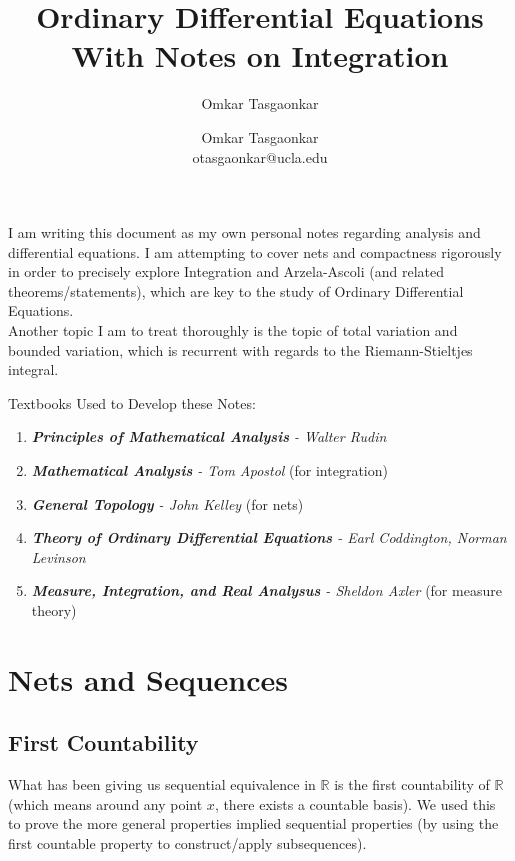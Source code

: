 \documentclass[10pt,letterpaper]{article} %
\author{Omkar Tasgaonkar}
\title{Ordinary Differential Equations \\[0.5em] \large With Notes on Integration}
\author{Omkar Tasgaonkar \\ \small otasgaonkar@ucla.edu}
\date{}
\begin{document}
\maketitle
I am writing this document as my own personal notes regarding analysis and differential equations. I am attempting to cover nets and compactness rigorously in order to precisely explore Integration and Arzela-Ascoli (and related theorems/statements), which are key to the study of Ordinary Differential Equations.\\

Another topic I am to treat thoroughly is the topic of total variation and bounded variation, which is recurrent with regards to the Riemann-Stieltjes integral.\\

\begin{tcolorbox}[colback=white, colframe=black, arc=0mm]
Textbooks Used to Develop these Notes:
\begin{enumerate}
\item \textit{\textbf{Principles of Mathematical Analysis} - Walter Rudin}
\item \textit{\textbf{Mathematical Analysis} - Tom Apostol} (for integration)
\item \textit{\textbf{General Topology} - John Kelley} (for nets)
\item \textit{\textbf{Theory of Ordinary Differential Equations} - Earl Coddington, Norman Levinson}
\item \textit{\textbf{Measure, Integration, and Real Analysus} - Sheldon Axler} (for measure theory)
\end{enumerate}
\end{tcolorbox}
\thispagestyle{firstpage}
\newpage
\begin{tcolorbox}[colback=white, colframe=black, arc=0mm]
\tableofcontents
\end{tcolorbox}
\setcounter{section}{-1}

\pagebreak

\section{Nets and Sequences}

\subsection{First Countability}
What has been giving us sequential equivalence in $\mathbb{R}$ is the first countability of $\mathbb{R}$ (which means around any point $x$, there exists a countable basis). We used this to prove the more general properties implied sequential properties (by using the first countable property to construct/apply subsequences).\\
\end{document}
